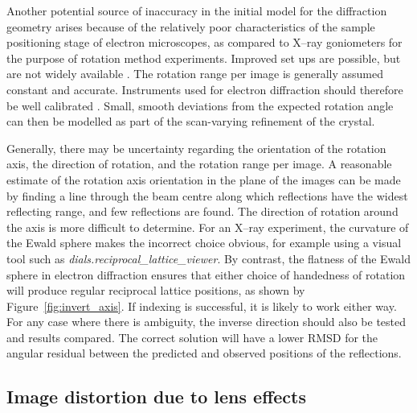 \documentclass[preprint]{iucr}
\newcommand{\dialsreciprocallatticeviewer}{\emph{dials.reciprocal\_lattice\_viewer}\xspace}
\begin{document}
Another potential source of inaccuracy in the initial model for the diffraction
geometry arises because of the relatively poor characteristics of the sample
positioning stage of electron microscopes, as compared to X--ray goniometers for the
purpose of rotation method experiments. Improved set ups are possible,
but are not widely available \cite{Yonekura2015,Shi2016}.
The rotation range per image is generally assumed constant and accurate.
Instruments used
for electron diffraction should therefore be well calibrated
\cite{gemmi_adt:2015}. Small, smooth deviations from the expected rotation angle
can then be modelled as part of the scan-varying refinement of the crystal.

Generally, there may be
uncertainty regarding the orientation of the rotation axis, the direction of
rotation, and the rotation range per image. A reasonable estimate of the
rotation axis orientation in the plane of the images can be made by finding a
line through the beam centre along which reflections have the widest reflecting
range, and few reflections are found. The direction of rotation around the axis
is more difficult to determine. For an X--ray experiment, the curvature of the
Ewald sphere makes the incorrect choice obvious, for example using a visual
tool such as \dialsreciprocallatticeviewer \cite{Winter2018}. By contrast, the
flatness of the Ewald sphere in electron diffraction ensures that either choice
of handedness of rotation will produce regular reciprocal lattice positions,
as shown by Figure~\ref{fig:invert_axis}. If indexing is successful, it is
likely to work either way. For any case where there is ambiguity, the inverse
direction should also be tested and results compared. The correct solution will
have a lower RMSD for the angular residual between the predicted and observed
positions of the reflections.

\subsection{Image distortion due to lens effects \label{sec:distortion}}
\end{document}
